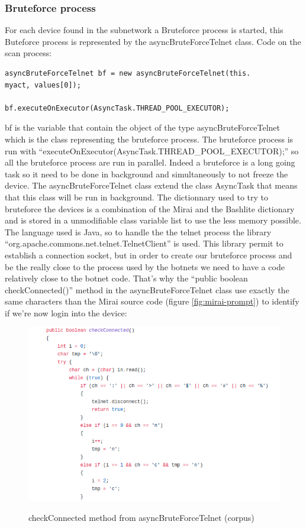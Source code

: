 \documentclass{report}
\begin{document}
\subsubsection{Bruteforce process}
For each device found in the subnetwork a Bruteforce process is started, this Buteforce process is represented by the asyncBruteForceTelnet class.\newline
Code on the scan process:
\lstset{language=Java}
\begin{lstlisting}[frame=single]
asyncBruteForceTelnet bf = new asyncBruteForceTelnet(this.
myact, values[0]);

bf.executeOnExecutor(AsyncTask.THREAD_POOL_EXECUTOR);
\end{lstlisting}
bf is the variable that contain the object of the type asyncBruteForceTelnet which is the class representing the bruteforce process. The bruteforce process is run with ``executeOnExecutor(AsyncTask.THREAD\_POOL\_EXECUTOR);'' so all the bruteforce process are run in parallel. Indeed a bruteforce is a long going task so it need to be done in background and simultaneously to not freeze the device.\newline
The asyncBruteForceTelnet class extend the class AsyncTask that means that this class will be run in background. The dictionnary used to try to bruteforce the devices is a combination of the Mirai and the Bashlite dictionary and is stored in a unmodifiable class variable list to use the less memory possible.\newline
The language used is Java, so to handle the the telnet process the library ``org.apache.commons.net.telnet.TelnetClient'' is used. This library permit to establish a connection socket, but in order to create our bruteforce process and be the really close to the process used by the botnets we need to have a code relatively close to the botnet code. That's why the ``public boolean checkConnected()'' method in the asyncBruteForceTelnet class use exactly the same characters than the Mirai source code (figure \ref{fig:mirai-prompt}) to identify if we're now login into the device:
\begin{figure}[h]
 \caption{checkConnected method from asyncBruteForceTelnet (corpus)}
 \centering
 \includegraphics[width=1\textwidth]{./img/checkconnected-apk}
 \label{fig:checkconnected}
\end{figure}
\end{document}
